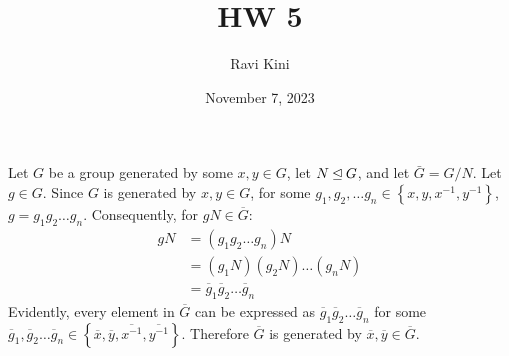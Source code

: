 \documentclass{article}
\title{HW 5}
\author{Ravi Kini}
\date{November 7, 2023}
\begin{document}
\maketitle

\problem
Let $G$ be a group generated by some $x, y \in G$, let $N \unlhd G$, and let $\bar G = G/N$. Let $g \in G$. Since $G$ is generated by $x, y \in G$, for some $g_1, g_2, \ldots g_n \in \left\{x, y, x^{-1}, y^{-1}\right\}$, $g = g_1g_2\ldots g_n$. Consequently, for $gN \in \overline{G}$:
\begin{equation}
    \begin{split}
        gN & = \left(g_1g_2\ldots g_n\right)N \\
        & = \left(g_1N\right)\left(g_2N\right)\ldots\left(g_nN\right) \\
        & = \overline{g}_1\overline{g}_2\ldots\overline{g}_n
    \end{split}
\end{equation}
Evidently, every element in $\overline{G}$ can be expressed as $\overline{g}_1\overline{g}_2\ldots\overline{g}_n$ for some $\overline{g}_1, \overline{g}_2\ldots \overline{g}_n \in \left\{\overline{x}, \overline{y}, \overline{x^{-1}}, \overline{y^{-1}}\right\}$. Therefore $\overline{G}$ is generated by $\overline{x}, \overline{y} \in \overline{G}$.

\newpage

\end{document}
